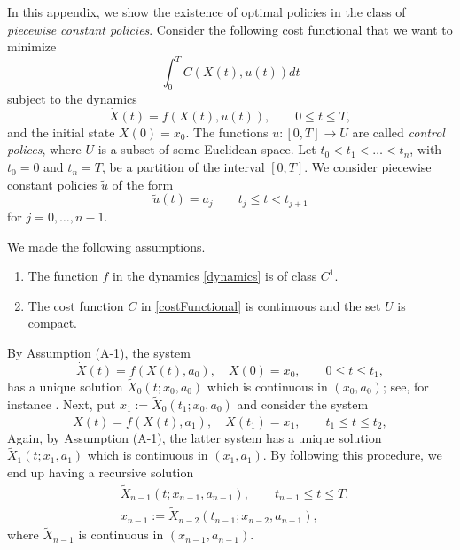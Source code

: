 In this appendix, we show the existence of optimal policies in the class of
{\it piecewise constant policies}. Consider the following cost functional that
we want to minimize
\begin{equation}\label{costFunctional}
  \int_0^T C(X(t),u(t)) dt
\end{equation}
subject to the dynamics
\begin{equation}\label{dynamics}
  \dot{X}(t) = f(X(t),u(t)),  \qquad    0\leq t \leq T,
\end{equation}
and the initial state $X(0)=x_0$. The functions $u:[0,T]\to U$ are called {\it
control polices}, where $U$ is a subset of some Euclidean space.
%
Let $t_0<t_1<\ldots <t_n$, with
$t_0=0$ and $t_n=T$, be a partition of the interval $[0,T]$.
We consider piecewise constant policies $\tilde{u}$ of the form
\begin{equation}\label{PieceConstCont}
  \tilde{u}(t) = a_j\qquad t_j\leq t < t_{j+1}
\end{equation}
 for $j=0,\ldots,n-1$.
\begin{assumptions}
    We made the following assumptions.
    \begin{enumerate}[label=\textbf{(ASS-\arabic*)}]
        \item
            The function $f$ in the dynamics \eqref{dynamics} is of
            class $C^1$.
        \item
            The cost function $C$ in \eqref{costFunctional} is continuous and
            the set $U$ is compact.
    \end{enumerate}
\end{assumptions}
%

    By Assumption (A-1)\textbf{}, the system
\[
  \dot{X}(t) = f(X(t),a_0), \quad X(0)=x_0, \qquad    0\leq t \leq t_1,
\]
has a unique solution $\tilde{X}_0(t;x_0,a_0)$ which is continuous in
$(x_0,a_0)$; see, for instance \cite{Kong2014}.  Next, put $x_1:=\tilde{X}_0(t_1;x_0,a_0)$ and consider the system
\[
  \dot{X}(t) = f(X(t),a_1), \quad X(t_1)=x_1, \qquad    t_1\leq t \leq t_2,
\]
Again, by Assumption (A-1), the latter system has a unique solution
$\tilde{X}_1(t;x_1,a_1)$ which is
continuous in $(x_1,a_1)$. By following this procedure, we end up having a
recursive solution
\begin{equation*}
  \begin{aligned}
    & \tilde{X}_{n-1}(t;x_{n-1},a_{n-1}),
    \qquad t_{n-1}\leq t \leq T,\\
    & x_{n-1}:=\tilde{X}_{n-2}(t_{n-1};x_{n-2},a_{n-1}),
  \end{aligned}
\end{equation*}
where $\tilde{X}_{n-1}$ is continuous in $(x_{n-1},a_{n-1})$.


